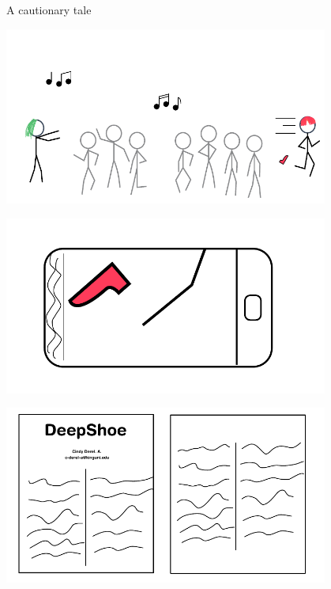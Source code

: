 \documentclass[aspectratio=169]{beamer}
\begin{document}
\begin{frame}{A cautionary tale}
{\begin{center}
        \end{center}
    }
     {
        \huge {}
        \begin{center}
        \includegraphics[width=0.8\textwidth]{img/princess-comics-escape.pdf}
        \end{center}
    }
     {
        \huge {}
        \begin{center}
        \includegraphics[width=0.8\textwidth]{img/princess-comics-shoe.pdf}
        \end{center}
    }
     {
        \huge {}
        \begin{center}
        \includegraphics[width=0.8\textwidth]{img/princess-comics-paper.pdf}

\end{center}}
\end{frame}
\end{document}

